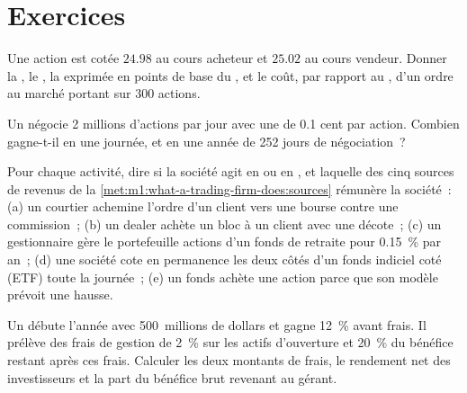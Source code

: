 \section{Exercices}

\begin{exercise}[$\star$]\label{exo:m1:what-a-trading-firm-does:1}
Une action est cotée $24.98$ au cours acheteur et $25.02$ au cours vendeur. Donner la
, le , la  exprimée en points de base du , et le
coût, par rapport au , d'un ordre au marché portant sur 300 actions.
\end{exercise}

\begin{exercise}[$\star$]\label{exo:m1:what-a-trading-firm-does:2}
Un  négocie 2 millions d'actions par jour avec une 
de 0.1 cent par action. Combien gagne-t-il en une journée, et en une année de 252 jours de négociation~?
\end{exercise}

\begin{exercise}[$\star$]\label{exo:m1:what-a-trading-firm-does:3}
Pour chaque activité, dire si la société agit en  ou en , et
laquelle des cinq sources de revenus de la
\cref{met:m1:what-a-trading-firm-does:sources} rémunère la société~: (a) un courtier achemine l'ordre
d'un client vers une bourse contre une commission~; (b) un dealer achète un bloc
à un client avec une décote~; (c) un gestionnaire gère le portefeuille actions d'un fonds de
retraite pour 0.15~\% par an~; (d) une société cote en permanence les deux côtés
d'un fonds indiciel coté (ETF) toute la journée~; (e) un fonds achète une action parce que son
modèle prévoit une hausse.
\end{exercise}

\begin{exercise}[$\star\star$]\label{exo:m1:what-a-trading-firm-does:4}
Un  débute l'année avec 500~millions de dollars et gagne 12~\% avant frais.
Il prélève des frais de gestion de 2~\% sur les actifs d'ouverture et 20~\% du bénéfice
restant après ces frais. Calculer les deux montants de frais, le rendement net des investisseurs et
la part du bénéfice brut revenant au gérant.
\end{exercise}

